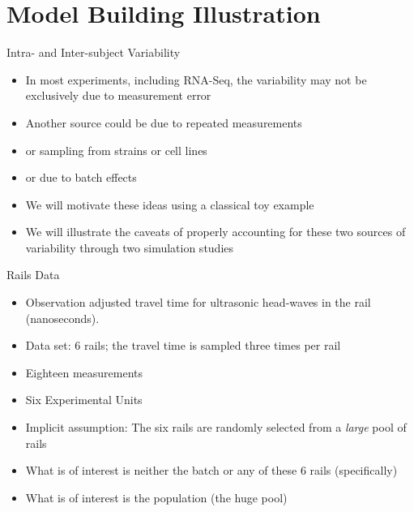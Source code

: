 \documentclass[xcolor=x11names,compress]{beamer}\usepackage[]{graphicx}\usepackage[]{color}
\begin{document}
\section[Model]{Model Building Illustration}


\begin{frame}{Intra- and Inter-subject Variability}
  \begin{itemize}
    \item In most experiments, including RNA-Seq, the variability may not be exclusively due to measurement
      error
  \item Another source could be due to repeated measurements
  \item or sampling from strains or cell lines
  \item or due to batch effects
  \item We will motivate these ideas using a classical toy example
  \item We will illustrate the caveats of properly
        accounting for these two sources of variability through
        two simulation studies
  \end{itemize}
\end{frame}


\begin{frame}[fragile]{Rails Data}
  \begin{itemize}
  \item Observation adjusted travel time for ultrasonic head-waves in the rail 
        (nanoseconds).
  \item Data set: 6 rails; the travel time is sampled three times per
        rail
  \item Eighteen measurements
  \item Six Experimental Units
  \item Implicit assumption: The six rails are randomly selected
        from a {\it large} pool of rails
  \item What is of interest is neither the batch or any of these
        6 rails (specifically)
  \item What is of interest is the population (the huge pool)
  \end{itemize}
\end{frame}
\end{document}
